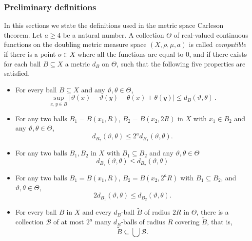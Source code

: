 \documentclass[12pt]{amsart}
\theoremstyle{definition}
\theoremstyle{plain}
\newcommand{\mfa}{{\vartheta}}
\newcommand{\mfb}{{\theta}}
\newcommand{\Mf}{{\Theta}}
\begin{document}
\subsubsection{Preliminary definitions}\label{subsubsec:definitions}

In this sections we state the definitions used in the metric space Carleson theorem.
Let $a \ge 4$ be a natural number. A collection $\Mf$ of real-valued continuous functions on the doubling metric measure space $(X,\rho,\mu,a)$ is called \emph{compatible}
if there is a point $o\in X$ where all the functions are equal to $0$,
and if there exists for each ball $B \subseteq X$ a metric $d_B$ on $\Mf$,
such that the following five properties are satisfied.
\begin{itemize}
\item For every ball $B \subseteq X$ and any $\mfa, \mfb \in \Mf$,
\begin{equation}\label{osccontrol}
    \sup_{x,y\in B}|\mfa(x)-{\mfa(y)}- \mfb(x)+{\mfb(y)}| \le d_{B}(\mfa,\mfb)\,.
\end{equation}
\item For any two balls $B_1=B(x_1,R)$, $B_2= B(x_2,2R)$ in $X$ with $x_1\in B_2$ and any $\mfa,\mfb\in \Mf$,
\begin{equation}\label{firstdb}
    d_{B_2}(\mfa,\mfb) \le 2^a d_{B_1}(\mfa,\mfb) .
\end{equation}
\item For any two balls $B_1, B_2$ in $X$ with $B_1 \subseteq B_2$ and any $\mfa, \mfb \in \Mf$
\begin{equation}\label{monotonedb}
    d_{B_1}(\mfa,\mfb) \le d_{B_2}(\mfa, \mfb)
\end{equation}
\item For any two balls
$B_1=B(x_1,R)$, $B_2= B(x_2,2^aR)$
with $B_1\subseteq B_2$, and $\mfa,\mfb\in \Mf$,
\begin{equation}\label{seconddb}
    2d_{B_1}(\mfa,\mfb) \le d_{B_2}(\mfa,\mfb) .
\end{equation}
\item For every ball $B$ in $X$ and every $d_B$-ball $\tilde B$ of radius $2R$ in $\Mf$, there is a collection $\mathcal{B}$ of
at most $2^a$ many $d_B$-balls of radius $R$ covering $\tilde B$, that is,
\begin{equation}\label{thirddb}
    \tilde B\subseteq \bigcup \mathcal{B}.
\end{equation}

\end{itemize}
\end{document}
